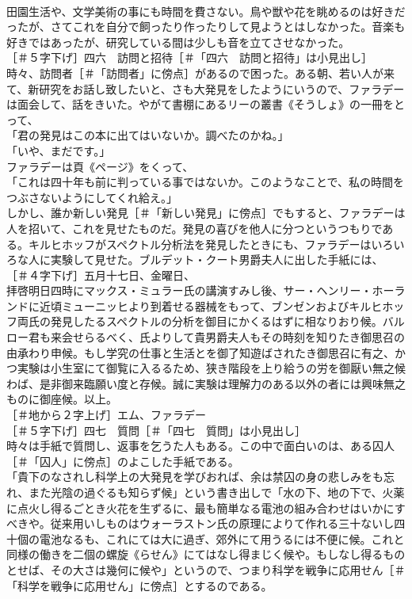 \documentclass[8pt]{extreport}
\begin{document}
\begin{CJK}{UTF8}{min}
\\	田園生活や、文学美術の事にも時間を費さない。鳥や獣や花を眺めるのは好きだったが、さてこれを自分で飼ったり作ったりして見ようとはしなかった。音楽も好きではあったが、研究している間は少しも音を立てさせなかった。
\\	［＃５字下げ］四六　訪問と招待［＃「四六　訪問と招待」は小見出し］
\\	時々、訪問者［＃「訪問者」に傍点］があるので困った。ある朝、若い人が来て、新研究をお話し致したいと、さも大発見をしたようにいうので、ファラデーは面会して、話をきいた。やがて書棚にあるリーの叢書《そうしょ》の一冊をとって、
\\	「君の発見はこの本に出てはいないか。調べたのかね。」
\\	「いや、まだです。」
\\	ファラデーは頁《ページ》をくって、
\\	「これは四十年も前に判っている事ではないか。このようなことで、私の時間をつぶさないようにしてくれ給え。」
\\	しかし、誰か新しい発見［＃「新しい発見」に傍点］でもすると、ファラデーは人を招いて、これを見せたものだ。発見の喜びを他人に分つというつもりである。キルヒホッフがスペクトル分析法を発見したときにも、ファラデーはいろいろな人に実験して見せた。ブルデット・クート男爵夫人に出した手紙には、
\\	［＃４字下げ］五月十七日、金曜日、
\\	拝啓明日四時にマックス・ミュラー氏の講演すみし後、サー・ヘンリー・ホーランドに近頃ミューニッヒより到着せる器械をもって、ブンゼンおよびキルヒホッフ両氏の発見したるスペクトルの分析を御目にかくるはずに相なりおり候。バルロー君も来会せらるべく、氏よりして貴男爵夫人もその時刻を知りたき御思召の由承わり申候。もし学究の仕事と生活とを御了知遊ばされたき御思召に有之、かつ実験は小生室にて御覧に入るるため、狭き階段を上り給うの労を御厭い無之候わば、是非御来臨願い度と存候。誠に実験は理解力のある以外の者には興味無之ものに御座候。以上。
\\	［＃地から２字上げ］エム、ファラデー
\\	［＃５字下げ］四七　質問［＃「四七　質問」は小見出し］
\\	時々は手紙で質問し、返事を乞うた人もある。この中で面白いのは、ある囚人［＃「囚人」に傍点］のよこした手紙である。
\\	「貴下のなされし科学上の大発見を学びおれば、余は禁囚の身の悲しみをも忘れ、また光陰の過ぐるも知らず候」という書き出しで「水の下、地の下で、火薬に点火し得るごとき火花を生ずるに、最も簡単なる電池の組み合わせはいかにすべきや。従来用いしものはウォーラストン氏の原理によりて作れる三十ないし四十個の電池なるも、これにては大に過ぎ、郊外にて用うるには不便に候。これと同様の働きを二個の螺旋《らせん》にてはなし得まじく候や。もしなし得るものとせば、その大さは幾何に候や」というので、つまり科学を戦争に応用せん［＃「科学を戦争に応用せん」に傍点］とするのである。

\end{CJK}
\end{document}
